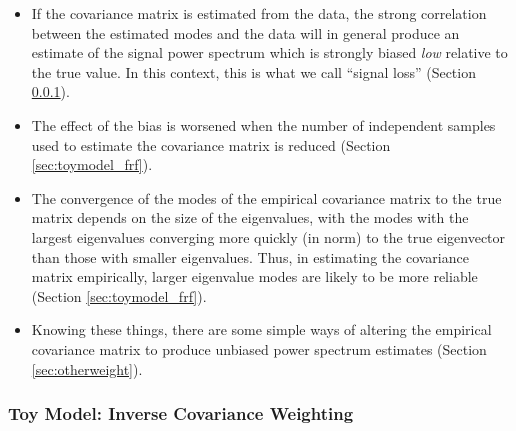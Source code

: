 \documentclass[preprint2,numberedappendix,tighten]{aastex6}  %
\begin{document}
\begin{itemize}

\item If the covariance matrix is estimated from the data, the strong correlation between the estimated modes and the data will in general produce an estimate of the signal power spectrum which is strongly biased {\it low} relative to the true value.  In this context, this is what we call ``signal loss''  (Section \ref{sec:toymodel}).

\item The effect of the bias is worsened when the number of independent samples used to estimate the covariance matrix is reduced (Section \ref{sec:toymodel_frf}).

\item The convergence of the modes of the empirical covariance matrix to the true matrix depends on the size of the eigenvalues, with the modes with the largest eigenvalues converging more quickly (in norm) to the true eigenvector than those with smaller eigenvalues. Thus, in estimating the covariance matrix empirically, larger eigenvalue modes are likely to be more reliable (Section \ref{sec:toymodel_frf}).

\item Knowing these things, there are some simple ways of altering the empirical covariance matrix to produce unbiased power spectrum estimates (Section \ref{sec:otherweight}).


\end{itemize}


\subsubsection{Toy Model: Inverse Covariance Weighting}
\label{sec:toymodel}
\end{document}
